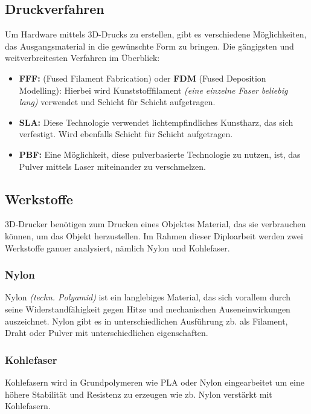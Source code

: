 \subsection{Druckverfahren}

Um Hardware mittels 3D-Drucks zu erstellen, gibt es verschiedene Möglichkeiten, das Ausgangsmaterial in die gewünschte Form zu bringen. Die gängigsten und weitverbreitesten Verfahren im Überblick: 

\begin{itemize}
	\item \textbf{FFF:} (Fused Filament Fabrication) oder \textbf{FDM} (Fused Deposition Modelling): Hierbei wird Kunststofffilament \emph{(eine einzelne Faser beliebig lang)} verwendet und Schicht für Schicht aufgetragen.
	\item \textbf{SLA:} Diese Technologie verwendet lichtempfindliches Kunstharz, das sich verfestigt. Wird ebenfalls Schicht für Schicht aufgetragen.
	\item \textbf{PBF:} Eine Möglichkeit, diese pulverbasierte Technologie zu nutzen, ist, das Pulver mittels Laser miteinander zu verschmelzen. 
\end{itemize}
\cite{kaffka} \cite{3ds}

\subsection{Werkstoffe}
3D-Drucker benötigen zum Drucken eines Objektes Material, das sie verbrauchen können, um das Objekt herzustellen. Im Rahmen dieser Diploarbeit werden zwei Werkstoffe ganuer analysiert, nämlich Nylon und Kohlefaser.

\subsubsection{Nylon}
Nylon \emph{(techn. Polyamid)} ist ein langlebiges Material, das sich vorallem durch seine Widerstandfähigkeit gegen Hitze und mechanischen Auseneinwirkungen auszeichnet. Nylon gibt es in unterschiedlichen Ausführung zb. als Filament, Draht oder Pulver mit unterschiedlichen eigenschaften. \cite{Nylon}
\subsubsection{Kohlefaser}
Kohlefasern wird in Grundpolymeren wie PLA oder Nylon eingearbeitet um eine höhere Stabilität und Resistenz zu erzeugen wie zb. Nylon verstärkt mit Kohlefasern.\\
 \cite{Kohlefasern}


